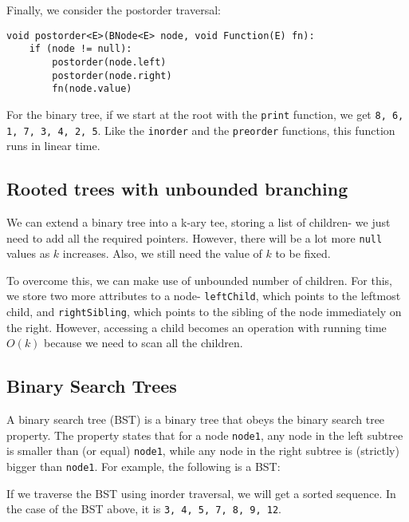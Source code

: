 \documentclass[a4paper, openany]{memoir}
\begin{document}
\noindent Finally, we consider the postorder traversal:
\begin{lstlisting}[language=pseudocode]
void postorder<E>(BNode<E> node, void Function(E) fn):
    if (node != null):
        postorder(node.left)
        postorder(node.right)
        fn(node.value)
\end{lstlisting}
For the binary tree, if we start at the root with the \texttt{print} function, we get \texttt{8, 6, 1, 7, 3, 4, 2, 5}. Like the \texttt{inorder} and the \texttt{preorder} functions, this function runs in linear time.

\subsection{Rooted trees with unbounded branching}
We can extend a binary tree into a k-ary tee, storing a list of children- we just need to add all the required pointers. However, there will be a lot more \texttt{null} values as $k$ increases. Also, we still need the value of $k$ to be fixed.

\noindent To overcome this, we can make use of unbounded number of children. For this, we store two more attributes to a node- \texttt{leftChild}, which points to the leftmost child, and \texttt{rightSibling}, which points to the sibling of the node immediately on the right. However, accessing a child becomes an operation with running time $O(k)$ because we need to scan all the children.

\subsection{Binary Search Trees}
A binary search tree (BST) is a binary tree that obeys the binary search tree property. The property states that for a node \texttt{node1}, any node in the left subtree is smaller than (or equal) \texttt{node1}, while any node in the right subtree is (strictly) bigger than \texttt{node1}. For example, the following is a BST:
\begin{center}
\end{center}
If we traverse the BST using inorder traversal, we will get a sorted sequence. In the case of the BST above, it is \texttt{3, 4, 5, 7, 8, 9, 12}.
\end{document}
